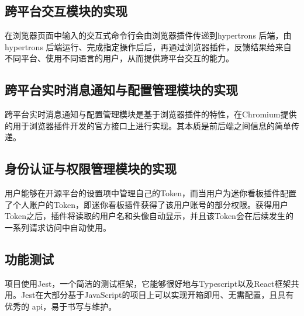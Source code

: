 \subsection{跨平台交互模块的实现}
\par 在浏览器页面中输入的交互式命令行会由浏览器插件传递到hypertrons 后端，由hypertrons 后端运行、完成指定操作后后，再通过浏览器插件，反馈结果给来自不同平台、使用不同语言的用户，从而提供跨平台交互的能力。

\subsection{跨平台实时消息通知与配置管理模块的实现}
\par 跨平台实时消息通知与配置管理模块是基于浏览器插件的特性，在Chromium提供的用于浏览器插件开发的官方接口上进行实现。其本质是前后端之间信息的简单传递。

\subsection{身份认证与权限管理模块的实现}
\par 用户能够在开源平台的设置项中管理自己的Token，而当用户为迷你看板插件配置了个人账户的Token，即迷你看板插件获得了该用户账号的部分权限。获得用户Token之后，插件将读取的用户名和头像自动显示，并且该Token会在后续发生的一系列请求访问中自动使用。

\subsection{功能测试}
\par 项目使用Jest，一个简洁的测试框架，它能够很好地与Typescript以及React框架共用。Jest在大部分基于JavaScript的项目上可以实现开箱即用、无需配置，且具有优秀的 api，易于书写与维护。




